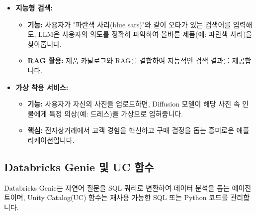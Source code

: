 \documentclass[11pt,a4paper]{article}
\theoremstyle{definition}
\begin{document}
\begin{itemize}
    \item \textbf{지능형 검색:}
    \begin{itemize}
        \item \textbf{기능:} 사용자가 "파란색 사리(blue sars)"와 같이 오타가 있는 검색어를 입력해도, LLM은 사용자의 의도를 정확히 파악하여 올바른 제품(예: 파란색 사리)을 찾아줍니다.
        \item \textbf{RAG 활용:} 제품 카탈로그와 RAG를 결합하여 지능적인 검색 결과를 제공합니다.
    \end{itemize}
    \item \textbf{가상 착용 서비스:}
    \begin{itemize}
        \item \textbf{기능:} 사용자가 자신의 사진을 업로드하면, Diffusion 모델이 해당 사진 속 인물에게 특정 의상(예: 드레스)을 가상으로 입혀줍니다.
        \item \textbf{핵심:} 전자상거래에서 고객 경험을 혁신하고 구매 결정을 돕는 흥미로운 애플리케이션입니다.
    \end{itemize}
\end{itemize}

\subsection{Databricks Genie 및 UC 함수}

Databricks Genie는 자연어 질문을 SQL 쿼리로 변환하여 데이터 분석을 돕는 에이전트이며, Unity Catalog(UC) 함수는 재사용 가능한 SQL 또는 Python 코드를 관리합니다.
\end{document}
